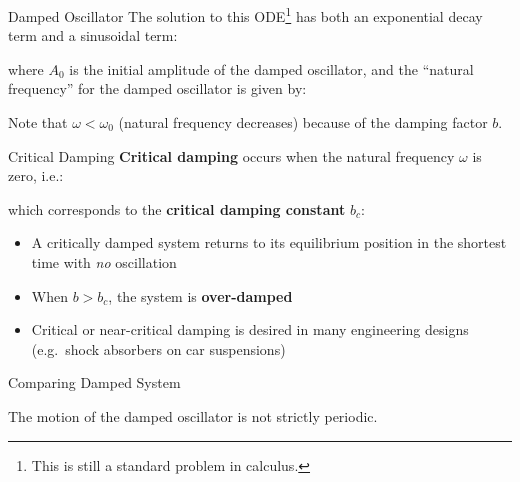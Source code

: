 \documentclass[12pt,compress,aspectratio=169]{beamer}
\begin{document}
\begin{frame}{Damped Oscillator}
  The solution to this ODE\footnote{This is still a standard problem in
    calculus.} has both an {\color{red}exponential decay term} and a
  {\color{blue}sinusoidal term}:


  \vspace{-.1in}where $A_0$ is the initial amplitude of the damped oscillator,
  and the ``natural frequency'' for the damped oscillator is given by:

  
  Note that $\omega<\omega_0$ (natural frequency decreases) because of the
  damping factor $b$.
  \vspace{.35in}
\end{frame}



\begin{frame}{Critical Damping}
  \textbf{Critical damping} occurs when the natural frequency $\omega$ is zero,
  i.e.:
  

  which corresponds to the \textbf{critical damping constant} $b_c$:

  \begin{itemize}
  \item A critically damped system returns to its equilibrium position in the
    shortest time with \emph{no} oscillation
  \item When $b>b_c$, the system is \textbf{over-damped}
  \item Critical or near-critical damping is desired in many engineering
    designs (e.g.\ shock absorbers on car suspensions)
  \end{itemize}
\end{frame}



\begin{frame}{Comparing Damped System}
  \centering
  
  The motion of the damped oscillator is not strictly periodic.
\end{frame}



%
%
%
%
%
\end{document}
